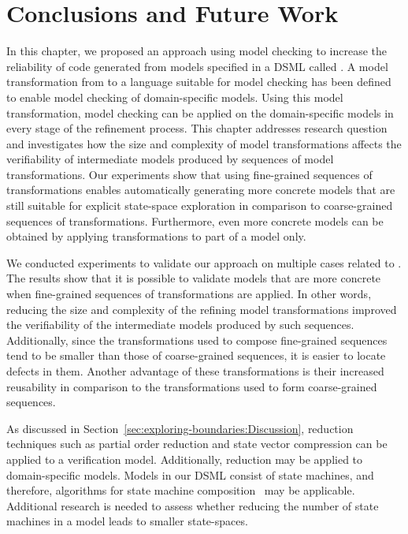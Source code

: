 \section{Conclusions and Future Work}
\label{sec:exploring-boundaries:Conclusions_and_Future_Work}
In this chapter, we proposed an approach using model checking to increase the reliability of code generated from models specified in a DSML called \SLCO.
A model transformation from \SLCO to a language suitable for model checking has been defined to enable model checking of domain-specific models.
Using this model transformation, model checking can be applied on the domain-specific models in every stage of the refinement process.
This chapter addresses research question~ and investigates how the size and complexity of model transformations affects the verifiability of intermediate models produced by sequences of model transformations.
Our experiments show that using fine-grained sequences of transformations enables automatically generating more concrete models that are still suitable for explicit state-space exploration in comparison to coarse-grained sequences of transformations.
Furthermore, even more concrete models can be obtained by applying transformations to part of a model only.

We conducted experiments to validate our approach on multiple cases related to \SLCO.
The results show that it is possible to validate models that are more concrete when fine-grained sequences of transformations are applied.
In other words, reducing the size and complexity of the refining model transformations improved the verifiability of the intermediate models produced by such sequences.
Additionally, since the transformations used to compose fine-grained sequences tend to be smaller than those of coarse-grained sequences, it is easier to locate defects in them.
Another advantage of these transformations is their increased reusability in comparison to the transformations used to form coarse-grained sequences.

As discussed in Section~\ref{sec:exploring-boundaries:Discussion}, reduction techniques such as partial order reduction and state vector compression can be applied to a verification model.
Additionally, reduction may be applied to domain-specific models.
Models in our DSML consist of state machines, and therefore, algorithms for state machine composition~\cite{Holzmann1991} may be applicable.
Additional research is needed to assess whether reducing the number of state machines in a model leads to smaller state-spaces.

